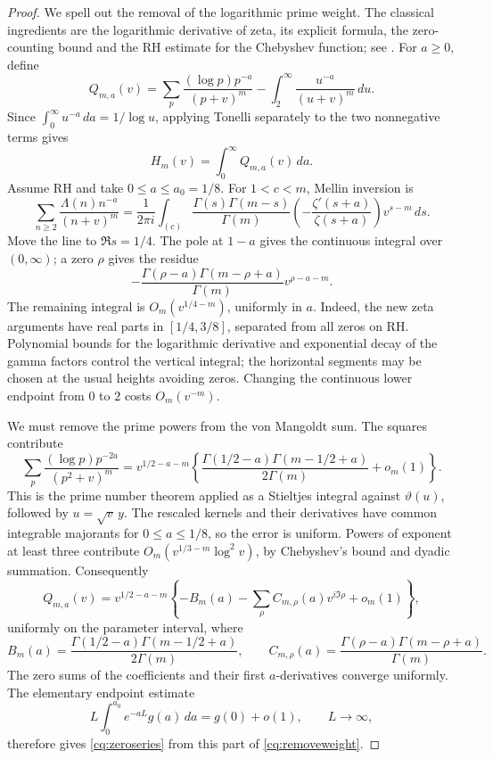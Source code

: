 \begin{proof}
We spell out the removal of the logarithmic prime weight. The classical
ingredients are the logarithmic derivative of zeta, its explicit formula,
the zero-counting bound and the RH estimate for the Chebyshev function; see
\cite[Chapters II, III, IX and XIV]{Titchmarsh1986}.
For \(a\geq0\), define
\[
 Q_{m,a}(v)=
 \sum_p\frac{(\log p)p^{-a}}{(p+v)^m}
 -\int_2^\infty\frac{u^{-a}}{(u+v)^m}\,du .
\]
Since \(\int_0^\infty u^{-a}\,da=1/\log u\), applying Tonelli separately to the
two nonnegative terms gives
\begin{equation}\label{cq:removeweight}
                      H_m(v)=\int_0^\infty Q_{m,a}(v)\,da.
\end{equation}
Assume RH and take \(0\leq a\leq a_0=1/8\). For \(1<c<m\), Mellin inversion is
\[
 \sum_{n\geq2}\frac{\Lambda(n)n^{-a}}{(n+v)^m}
 =\frac{1}{2\pi i}\int_{(c)}
 \frac{\Gamma(s)\Gamma(m-s)}{\Gamma(m)}
 \left(-\frac{\zeta'(s+a)}{\zeta(s+a)}\right)v^{s-m}\,ds.
\]
Move the line to \(\Re s=1/4\). The pole at \(1-a\) gives the continuous
integral over \((0,\infty)\); a zero \(\rho\) gives the residue
\[
 -\frac{\Gamma(\rho-a)\Gamma(m-\rho+a)}{\Gamma(m)}v^{\rho-a-m}.
\]
The remaining integral is \(O_m(v^{1/4-m})\), uniformly in \(a\).
Indeed, the new zeta arguments have real parts in \([1/4,3/8]\), separated
from all zeros on RH. Polynomial bounds for the logarithmic derivative and
exponential decay of the gamma factors control the vertical integral;
the horizontal segments may be chosen at the usual heights avoiding zeros.
Changing the continuous lower endpoint from \(0\) to \(2\) costs \(O_m(v^{-m})\).

We must remove the prime powers from the von Mangoldt sum. The squares
contribute
\[
 \sum_p\frac{(\log p)p^{-2a}}{(p^2+v)^m}
 =v^{1/2-a-m}
 \left\{\frac{\Gamma(1/2-a)\Gamma(m-1/2+a)}{2\Gamma(m)}+o_m(1)\right\}.
\]
This is the prime number theorem applied as a Stieltjes integral against
\(\vartheta(u)\), followed by \(u=\sqrt v\,y\). The rescaled kernels and
their derivatives have common integrable majorants for \(0\leq a\leq1/8\),
so the error is uniform. Powers of exponent at least three contribute
\(O_m(v^{1/3-m}\log^2 v)\), by Chebyshev's bound and dyadic summation.
Consequently
\[
 Q_{m,a}(v)=v^{1/2-a-m}
 \left\{-B_m(a)-\sum_\rho C_{m,\rho}(a)v^{i\Im\rho}+o_m(1)\right\},
\]
uniformly on the parameter interval, where
\[
 B_m(a)=\frac{\Gamma(1/2-a)\Gamma(m-1/2+a)}{2\Gamma(m)},\qquad
 C_{m,\rho}(a)=\frac{\Gamma(\rho-a)\Gamma(m-\rho+a)}{\Gamma(m)}.
\]
The zero sums of the coefficients and their first \(a\)-derivatives converge
uniformly. The elementary endpoint estimate
\[
 L\int_0^{a_0}e^{-aL}g(a)\,da=g(0)+o(1),\qquad L\longrightarrow\infty,
\]
therefore gives \eqref{cq:zeroseries} from this part of \eqref{cq:removeweight}.


\end{proof}
